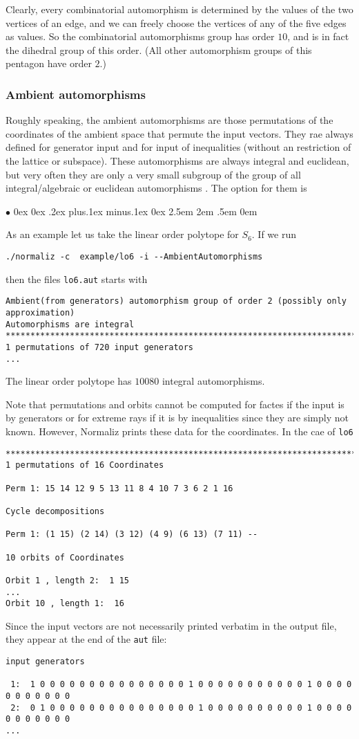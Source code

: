 \documentclass[12pt,a4paper]{scrartcl}
\newcommand{\stdli}{ \topsep0ex \partopsep0ex %
\parsep.2ex plus.1ex minus.1ex \itemsep0ex%
\leftmargin2.5em \labelwidth2em \labelsep.5em \rightmargin0em}%
\renewenvironment{itemize}{\begin{list}{{$\bullet$}}{\stdli}}{\end{list}}
\theoremstyle{definition}
\def\itemtt[#1]{\item[\textbf{\ttt{#1}}]}
\def\ttt{\texttt}
\begin{document}
Clearly, every combinatorial automorphism is determined by the values of the two vertices of an edge, and we can freely choose the vertices of any of the five edges as values. So the combinatorial automorphisms group has order $10$, and is in fact the dihedral group of this order. (All other automorphism groups of this pentagon have order $2$.)

\subsubsection{Ambient automorphisms}

Roughly speaking, the ambient automorphisms are those permutations of the coordinates of the ambient space that permute the input vectors. They rae always defined for generator input and for input of inequalities (without an restriction of the lattice or subspace). These automorphisms are always integral and euclidean, but very often they are only a very small subgroup of the group of all integral/algebraic or euclidean automorphisms . The option for them is
\begin{itemize}
	\itemtt[AmbientAutomorphisms]
\end{itemize}
As an example let us take the linear order polytope for $S_6$. If we run
\begin{Verbatim}
./normaliz -c  example/lo6 -i --AmbientAutomorphisms
\end{Verbatim}
then the files \verb|lo6.aut| starts with 
\begin{Verbatim}
Ambient(from generators) automorphism group of order 2 (possibly only approximation)
Automorphisms are integral
************************************************************************
1 permutations of 720 input generators
...
\end{Verbatim}
The linear order polytope  has $10080$ integral automorphisms.

Note that permutations and orbits cannot be computed for factes if the input is by generators or for extreme rays if it is by inequalities since they are simply not known. However, Normaliz prints these data for the coordinates. In the cae  of \verb|lo6|
\begin{Verbatim}
************************************************************************
1 permutations of 16 Coordinates

Perm 1: 15 14 12 9 5 13 11 8 4 10 7 3 6 2 1 16

Cycle decompositions 

Perm 1: (1 15) (2 14) (3 12) (4 9) (6 13) (7 11) --

10 orbits of Coordinates

Orbit 1 , length 2:  1 15
...
Orbit 10 , length 1:  16
\end{Verbatim}
Since the input vectors  are not necessarily printed verbatim in the output file, they appear at the end of the \verb|aut| file:
\begin{Verbatim}
input generators

 1:  1 0 0 0 0 0 0 0 0 0 0 0 0 0 0 0 1 0 0 0 0 0 0 0 0 0 0 0 1 0 0 0 0 0 0 0 0 0 0 0
 2:  0 1 0 0 0 0 0 0 0 0 0 0 0 0 0 0 0 1 0 0 0 0 0 0 0 0 0 0 1 0 0 0 0 0 0 0 0 0 0 0
...
\end{Verbatim}
\end{document}
